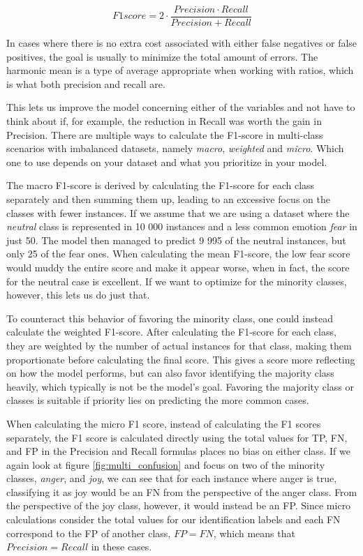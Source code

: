 \documentclass[nofilelist]{cslthse-msc}
\begin{document}
$$ F1score = 2 \cdot \frac{Precision \cdot Recall}{Precision + Recall}$$

In cases where there is no extra cost associated with either false negatives or false positives, the goal is usually to minimize the total amount of errors. The harmonic mean is a type of average appropriate when working with ratios, which is what both precision and recall are. 

This lets us improve the model concerning either of the variables and not have to think about if, for example, the reduction in Recall was worth the gain in Precision. There are multiple ways to calculate the F1-score in multi-class scenarios with imbalanced datasets, namely \textit{macro}, \textit{weighted} and \textit{micro}. Which one to use depends on your dataset and what you prioritize in your model. 

The macro F1-score is derived by calculating the F1-score for each class separately and then summing them up, leading to an excessive focus on the classes with fewer instances. If we assume that we are using a dataset where the \textit{neutral} class is represented in 10 000 instances and a less common emotion \textit{fear} in just 50. The model then managed to predict 9 995 of the neutral instances, but only 25 of the fear ones. When calculating the mean F1-score, the low fear score would muddy the entire score and make it appear worse, when in fact, the score for the neutral case is excellent. If we want to optimize for the minority classes, however, this lets us do just that. 

To counteract this behavior of favoring the minority class, one could instead calculate the weighted F1-score. After calculating the F1-score for each class, they are weighted by the number of actual instances for that class, making them proportionate before calculating the final score. This gives a score more reflecting on how the model performs, but can also favor identifying the majority class heavily, which typically is not be the model's goal. Favoring the majority class or classes is suitable if priority lies on predicting the more common cases.

When calculating the micro F1 score, instead of calculating the F1 scores separately, the F1 score is calculated directly using the total values for TP, FN, and FP in the Precision and Recall formulas places no bias on either class. If we again look at figure \ref{fig:multi_confusion} and focus on two of the minority classes, \textit{anger}, and \textit{joy}, we can see that for each instance where anger is true, classifying it as joy would be an FN from the perspective of the anger class. From the perspective of the joy class, however, it would instead be an FP. Since micro calculations consider the total values for our identification labels and each FN correspond to the FP of another class, $FP = FN$, which means that $Precision = Recall$ in these cases. 
\end{document}
